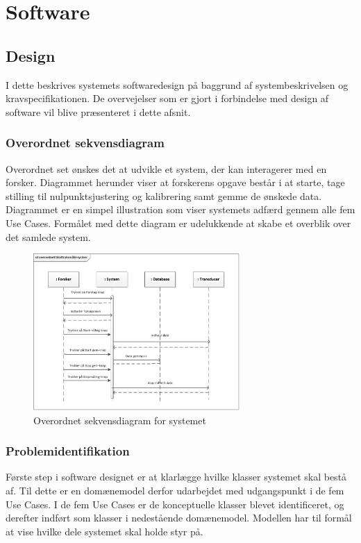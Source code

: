    
\section{Software}
\subsection{Design}
I dette beskrives systemets softwaredesign på baggrund af systembeskrivelsen og kravspecifikationen. De overvejelser som er gjort i forbindelse med design af software vil blive præsenteret i dette afsnit.

\subsubsection{Overordnet sekvensdiagram}
Overordnet set ønskes det at udvikle et system, der kan interagerer med en forsker. Diagrammet herunder viser at forskerens opgave består i at starte, tage stilling til nulpunktsjustering og kalibrering samt gemme de ønskede data. Diagrammet er en simpel illustration som viser systemets adfærd gennem alle fem Use Cases. Formålet med dette diagram er udelukkende at skabe et overblik over det samlede system.

\begin{figure}[H]
	\centering
	\includegraphics[width=0.7\textwidth]{Figurer/OverordnetSD}
	\caption{Overordnet sekvensdiagram for systemet}
\end{figure}

\subsubsection{Problemidentifikation}
Første step i software designet er at klarlægge hvilke klasser systemet skal bestå af. Til dette er en domænemodel derfor udarbejdet med udgangspunkt i de fem Use Cases. I de fem Use Cases er de konceptuelle klasser blevet identificeret, og derefter indført som klasser i nedestående domænemodel. Modellen har til formål at vise hvilke dele systemet skal holde styr på. 

